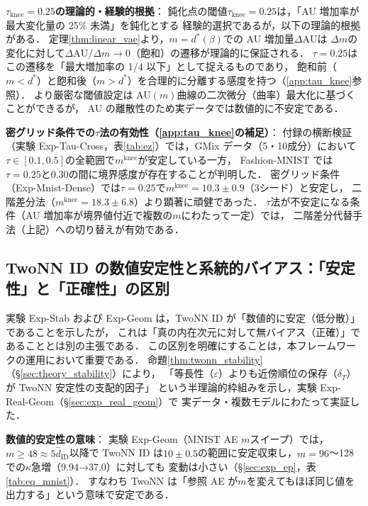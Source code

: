\documentclass[11pt,a4paper]{jsarticle}
\newcommand{\mknee}{m^{\mathrm{knee}}}
\begin{document}
\textbf{$\tau_{\mathrm{knee}} = 0.25$の理論的・経験的根拠}：
鈍化点の閾値$\tau_{\mathrm{knee}} = 0.25$は，「AU 増加率が最大変化量の 25\% 未満」を鈍化とする
経験的選択であるが，以下の理論的根拠がある．
定理\ref{thm:linear_vae}より，$m = d^*(\beta)$での AU 増加量$\Delta\mathrm{AU}$は
$\Delta m$の変化に対して$\Delta\mathrm{AU}/\Delta m \to 0$（飽和）の遷移が理論的に保証される．
$\tau = 0.25$はこの遷移を「最大増加率の 1/4 以下」として捉えるものであり，
飽和前（$m < d^*$）と飽和後（$m > d^*$）を合理的に分離する感度を持つ（\ref{app:tau_knee}参照）．
より厳密な閾値設定は AU$(m)$曲線の二次微分（曲率）最大化に基づくことができるが，
AU の離散性のため実データでは数値的に不安定である．

\textbf{密グリッド条件での$\tau$法の有効性（\ref{app:tau_knee}の補足）}：
付録の横断検証（実験 Exp-Tau-Cross，表\ref{tab:ez}）では，GMix データ（5・10成分）において
$\tau \in [0.1, 0.5]$の全範囲で$\mknee$が安定している一方，
Fashion-MNIST では$\tau = 0.25$と$0.30$の間に境界感度が存在することが判明した．
密グリッド条件（Exp-Mnist-Dense）では$\tau = 0.25$で$\mknee = 10.3 \pm 0.9$（3シード）と安定し，
二階差分法（$\mknee = 18.3 \pm 6.8$）より顕著に頑健であった．
$\tau$法が不安定になる条件（AU 増加率が境界値付近で複数の$m$にわたって一定）では，
二階差分代替手法（上記）への切り替えが有効である．

\subsection{TwoNN ID の数値安定性と系統的バイアス：「安定性」と「正確性」の区別}\label{sec:disc_twonn_bias}

実験 Exp-Stab および Exp-Geom は，TwoNN ID が「数値的に安定（低分散）」であることを示したが，
これは「真の内在次元に対して無バイアス（正確）」であることとは別の主張である．
この区別を明確にすることは，本フレームワークの運用において重要である．
命題\ref{thm:twonn_stability}（§\ref{sec:theory_stability}）により，
「等長性（$\varepsilon$）よりも近傍順位の保存（$\delta_T$）が TwoNN 安定性の支配的因子」
という半理論的枠組みを示し，実験 Exp-Real-Geom（§\ref{sec:exp_real_geom}）で
実データ・複数モデルにわたって実証した．

\textbf{数値的安定性の意味}：
実験 Exp-Geom（MNIST AE $m$スイープ）では，$m \geq 48 \approx 5\hat{d}_\mathrm{ID}$以降で
TwoNN ID は$10 \pm 0.5$の範囲に安定収束し，$m = 96$〜128 での$\kappa$急増（9.94→37.0）に対しても
変動は小さい（§\ref{sec:exp_ep}，表\ref{tab:eq_mnist}）．
すなわち TwoNN は「参照 AE が$m$を変えてもほぼ同じ値を出力する」という意味で安定である．
\end{document}
